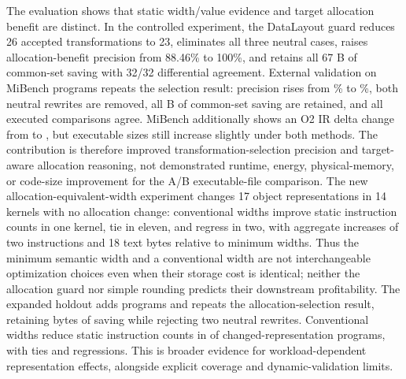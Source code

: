 \documentclass[11pt,twocolumn]{article}
\begin{document}
The evaluation shows that static width/value evidence and target allocation
benefit are distinct. In the controlled experiment, the DataLayout guard
reduces 26 accepted transformations to 23, eliminates all three neutral cases,
raises allocation-benefit precision from 88.46\% to 100\%, and retains all 67 B
of common-set saving with 32/32 differential agreement. External validation on
\ExternalPrograms{} MiBench programs repeats the selection result: precision
rises from \ExternalAPrecision\% to \ExternalBPrecision\%, both neutral rewrites
are removed, all \ExternalCommonSaved{} B of common-set saving are retained,
and all \ExternalDiffPassed{} executed comparisons agree. MiBench additionally
shows an O2 IR delta change from \ExternalAOtwoIR{} to \ExternalBOtwoIR{}, but
executable sizes still increase slightly under both methods. The contribution
is therefore improved transformation-selection precision and target-aware
allocation reasoning, not demonstrated runtime, energy, physical-memory, or
code-size improvement for the A/B executable-file comparison. The new
allocation-equivalent-width experiment changes 17 object representations in
14 kernels with no allocation change: conventional widths improve static
instruction counts in one kernel, tie in eleven, and regress in two, with
aggregate increases of two instructions and 18 text bytes relative to minimum
widths. Thus the minimum semantic width and a conventional width are not
interchangeable optimization choices even when their storage cost is identical;
neither the allocation guard nor simple rounding predicts their downstream
profitability. The expanded holdout adds \ExpandedPrograms{} programs and
repeats the allocation-selection result, retaining \ExpandedSavedBytes{} bytes
of saving while rejecting two neutral rewrites. Conventional widths reduce
static instruction counts in \ExpandedWidthBetter{} of
\ExpandedWidthPrograms{} changed-representation programs, with
\ExpandedWidthEqual{} ties and \ExpandedWidthWorse{} regressions. This is
broader evidence for workload-dependent representation effects, alongside
explicit coverage and dynamic-validation limits.

\balance


\end{document}
